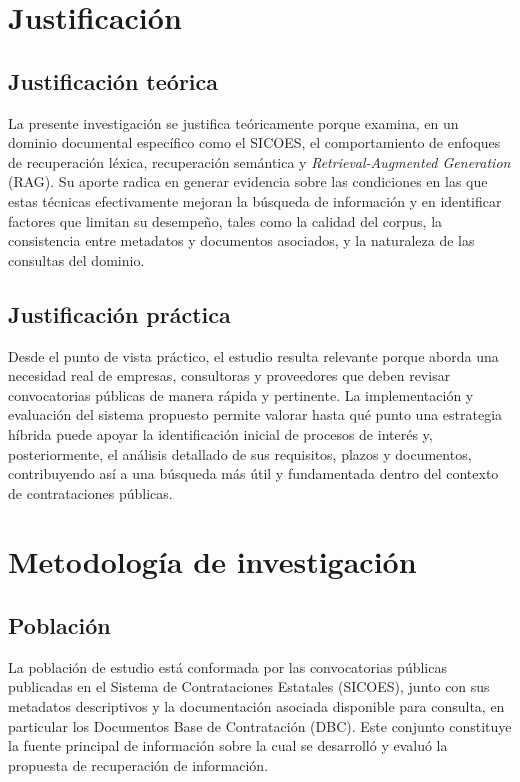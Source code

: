\section{Justificación}

\subsection{Justificación teórica}

La presente investigación se justifica teóricamente porque examina, en un dominio documental específico como el SICOES, el comportamiento de enfoques de recuperación léxica, recuperación semántica y \textit{Retrieval-Augmented Generation} (RAG). Su aporte radica en generar evidencia sobre las condiciones en las que estas técnicas efectivamente mejoran la búsqueda de información y en identificar factores que limitan su desempeño, tales como la calidad del corpus, la consistencia entre metadatos y documentos asociados, y la naturaleza de las consultas del dominio.

\subsection{Justificación práctica}

Desde el punto de vista práctico, el estudio resulta relevante porque aborda una necesidad real de empresas, consultoras y proveedores que deben revisar convocatorias públicas de manera rápida y pertinente. La implementación y evaluación del sistema propuesto permite valorar hasta qué punto una estrategia híbrida puede apoyar la identificación inicial de procesos de interés y, posteriormente, el análisis detallado de sus requisitos, plazos y documentos, contribuyendo así a una búsqueda más útil y fundamentada dentro del contexto de contrataciones públicas.

\section{Metodología de investigación}

\subsection{Población}

La población de estudio está conformada por las convocatorias públicas publicadas en el Sistema de Contrataciones Estatales (SICOES), junto con sus metadatos descriptivos y la documentación asociada disponible para consulta, en particular los Documentos Base de Contratación (DBC). Este conjunto constituye la fuente principal de información sobre la cual se desarrolló y evaluó la propuesta de recuperación de información.

